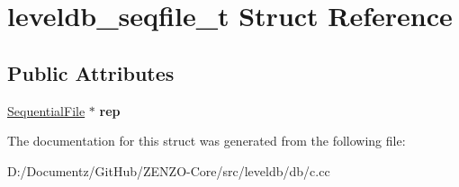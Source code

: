 \hypertarget{structleveldb__seqfile__t}{}\section{leveldb\+\_\+seqfile\+\_\+t Struct Reference}
\label{structleveldb__seqfile__t}
\subsection*{Public Attributes}
\begin{DoxyCompactItemize}
\item 
\mbox{\label{structleveldb__seqfile__t_a84b4a8638a6ad109e65b3c7923fde915}} 
\mbox{\hyperlink{classleveldb_1_1_sequential_file}{Sequential\+File}} $\ast$ {\bfseries rep}
\end{DoxyCompactItemize}


The documentation for this struct was generated from the following file\+:\begin{DoxyCompactItemize}
\item 
D\+:/\+Documentz/\+Git\+Hub/\+Z\+E\+N\+Z\+O-\/\+Core/src/leveldb/db/c.\+cc\end{DoxyCompactItemize}
